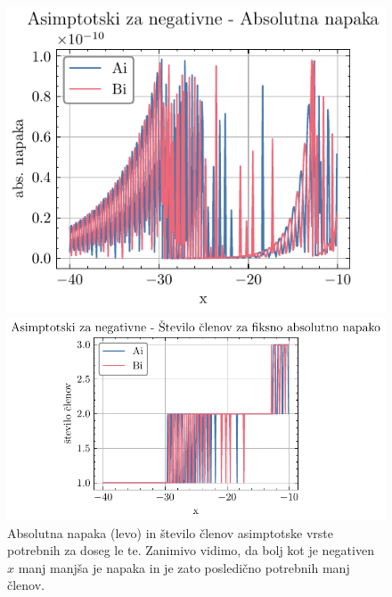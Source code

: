 \documentclass[slovene,11pt,a4paper]{article}
\begin{document}
\begin{figure}[h]%
  \centering
  \begin{minipage}{0.48\textwidth}
    \centering
    \includegraphics[width=\linewidth]{graphs/neg_abs_err.pdf}
  \end{minipage}\hfill
  \begin{minipage}{0.48\textwidth}
    \centering
    \includegraphics[width=\linewidth]{graphs/neg_abs_err_n.pdf}
  \end{minipage}
  \caption{Absolutna napaka (levo) in število členov asimptotske vrste potrebnih za doseg le te. Zanimivo vidimo, da bolj kot je negativen $x$ manj manjša je napaka in je zato posledično potrebnih manj členov.}
  \label{fig: neg_abs}
\end{figure}
\end{document}
